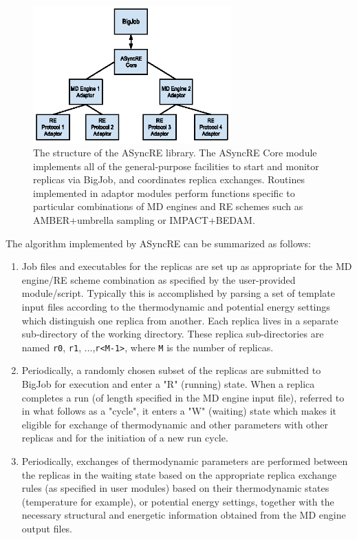 \documentclass{sig-alternate}
\begin{document}
\begin{figure}
\includegraphics[width=3in]{asyncre.eps}
\caption{\label{fig:aRE_chart}The structure of the ASyncRE
  library. The ASyncRE Core module implements all of the
  general-purpose facilities to start and monitor replicas via BigJob,
  and coordinates replica exchanges. Routines implemented in adaptor
  modules perform functions specific to particular combinations of MD
  engines and RE schemes such as AMBER+umbrella sampling or IMPACT+BEDAM.  }
\end{figure}


The algorithm implemented by ASyncRE can be summarized as follows:

\begin{enumerate}

\item Job files and executables for the replicas are set up as
  appropriate for the MD engine/RE scheme combination as specified by
  the user-provided module/script. Typically this is accomplished by parsing a
  set of template input files according to the thermodynamic and
  potential energy settings which distinguish one replica from
  another. Each replica lives in a separate sub-directory of the
  working directory. These replica sub-directories are named
  \verb+r0+, {\tt r1}, $\ldots$,\verb+r<M-1>+, where \verb+M+ is the
  number of replicas.

\item Periodically, a randomly chosen subset of the replicas are
  submitted to BigJob for execution and enter a "R" (running)
  state. When a replica completes a run (of length specified in the MD
  engine input file), referred to in what follows as a "cycle", it
  enters a "W" (waiting) state which makes it eligible for exchange of
  thermodynamic and other parameters with other replicas and for the
  initiation of a new run cycle.

\item Periodically, exchanges of thermodynamic parameters are
  performed between the replicas in the waiting state based on the
  appropriate replica exchange rules (as specified in user modules)
  based on their thermodynamic states (temperature for example), or
  potential energy settings, together with the necessary structural
  and energetic information obtained from the MD engine output files.

\end{enumerate}
\end{document}
